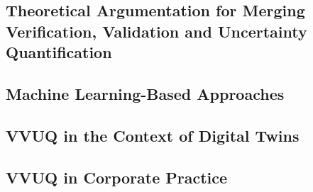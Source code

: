 \subsection{Theoretical Argumentation for Merging Verification, Validation and Uncertainty Quantification}

\subsection{Machine Learning-Based Approaches}

\subsection{VVUQ in the Context of Digital Twins}

\subsection{VVUQ in Corporate Practice}



